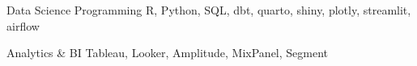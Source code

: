 

\begin{cvskills}

  \cvskill
    {Data Science Programming} %
    {R, Python, SQL, dbt, quarto, shiny, plotly, streamlit, airflow} %

\cvskill
{Analytics \& BI} %
{Tableau, Looker, Amplitude, MixPanel, Segment} %



\end{cvskills}
